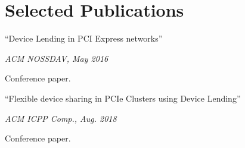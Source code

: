 \section{Selected Publications}
\parbox[t][][t]{\linewidth}{
	\parbox{\linewidth}{{``Device Lending in PCI Express networks''}}
	\smallbreak
	\parbox{\linewidth}{\emph{ACM NOSSDAV, May 2016}}
	\smallbreak
	Conference paper.
	\bigbreak
}

\parbox[t][][t]{\linewidth}{
	\parbox{\linewidth}{{``Flexible device sharing in PCIe Clusters using Device Lending''}}
	\smallbreak
	\parbox{\linewidth}{\emph{ACM ICPP Comp., Aug. 2018}}
	\smallbreak
	Conference paper.
	\bigbreak
}



